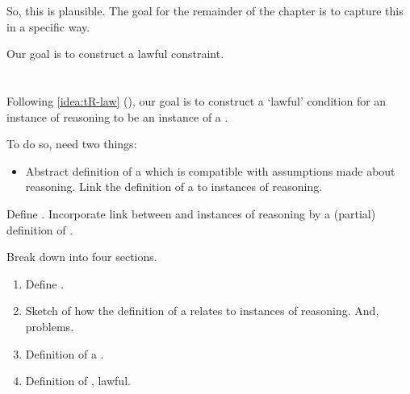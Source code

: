 \begin{note}
  So, this is plausible.
  The goal for the remainder of the chapter is to capture this in a specific way.

  Our goal is to construct a lawful constraint.
\end{note}

\section{}
\label{cha:typical:sec:tR}


\begin{note}
  Following \autoref{idea:tR-law} (), our goal is to construct a `lawful' condition for an instance of reasoning to be an instance of a \torN{}.

  To do so, need two things:

  \begin{itemize}
  \item
    Abstract definition of a \tor{} which is compatible with assumptions made about reasoning.
    Link the definition of a \tor{} to instances of reasoning.
  \end{itemize}

  Define \tor{}.
  Incorporate link between \torN{} and instances of reasoning by a (partial) definition of \tRN{}.
\end{note}

\begin{note}
  Break down into four sections.

  \begin{enumerate}[label=]
  \item

    Define \tor{}.
  \item

    Sketch of how the definition of a \tor{} relates to instances of reasoning.
    And, problems.
  \item

    Definition of a \rotorN{}.
  \item

    Definition of \tR{}, lawful.
  \end{enumerate}
\end{note}


